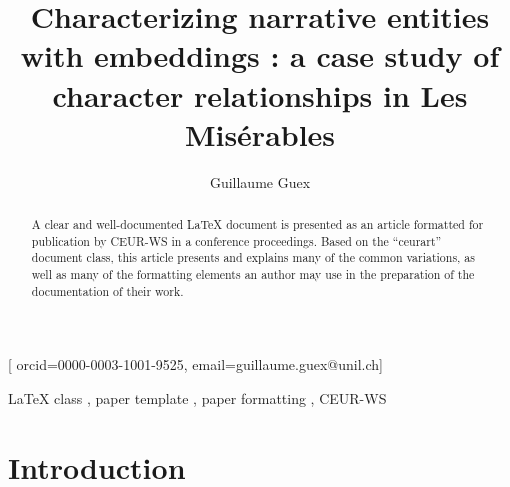 \documentclass[
twocolumn,
]{ceurart}
\begin{document}


\title{Characterizing narrative entities with embeddings : a case study of character relationships in Les Misérables}

\author[1]{Guillaume Guex}[%
orcid=0000-0003-1001-9525,
email=guillaume.guex@unil.ch]
\address[1]{Departement of Language and Information Sciences, University of Lausanne, Switzerland}

\begin{abstract}
  A clear and well-documented \LaTeX{} document is presented as an
  article formatted for publication by CEUR-WS in a conference
  proceedings. Based on the ``ceurart'' document class, this article
  presents and explains many of the common variations, as well as many
  of the formatting elements an author may use in the preparation of
  the documentation of their work.
\end{abstract}

\begin{keywords}
  LaTeX class \sep
  paper template \sep
  paper formatting \sep
  CEUR-WS
\end{keywords}

\maketitle

\section{Introduction}
\end{document}

